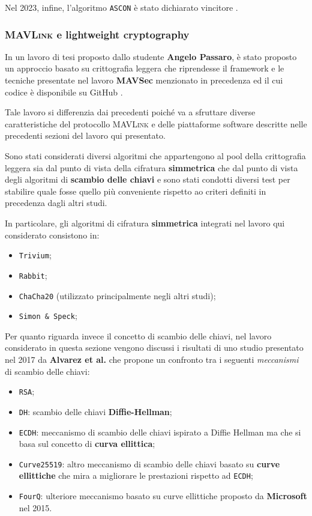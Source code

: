 \documentclass[a4paper, 12pt, oneside]{article}
\theoremstyle{definition}
\begin{document}
Nel 2023, infine, l'algoritmo \texttt{ASCON} è stato dichiarato vincitore \cite{nist-ascon-lwc}.
\newpage
\subsubsection{\textsc{MAVLink} e lightweight cryptography}
In un lavoro di tesi \cite{sec-uav} proposto dallo studente \textbf{Angelo Passaro}, è stato proposto un approccio basato su crittografia leggera che riprendesse il framework e le tecniche presentate nel lavoro \textbf{MAVSec} menzionato in precedenza ed il cui codice è disponibile su GitHub \cite{mavsec-github}.

Tale lavoro si differenzia dai precedenti poiché va a sfruttare diverse caratteristiche del protocollo \textsc{MAVLink} e delle piattaforme software descritte nelle precedenti sezioni del lavoro qui presentato.

Sono stati considerati diversi algoritmi che appartengono al pool della crittografia leggera sia dal punto di vista della cifratura \textbf{simmetrica} che dal punto di vista degli algoritmi di \textbf{scambio delle chiavi} e sono stati condotti diversi test per stabilire quale fosse quello più conveniente rispetto ao criteri definiti in precedenza dagli altri studi.

In particolare, gli algoritmi di cifratura \textbf{simmetrica} integrati nel lavoro qui considerato consistono in:

\begin{itemize}
    \item \texttt{Trivium};
    \item \texttt{Rabbit};
    \item \texttt{ChaCha20} (utilizzato principalmente negli altri studi);
    \item \texttt{Simon \& Speck};
\end{itemize}

Per quanto riguarda invece il concetto di scambio delle chiavi, nel lavoro considerato in questa sezione vengono discussi i risultati di uno studio \cite{10.1007/978-3-319-48799-1_58} presentato nel 2017 da \textbf{Alvarez et al.} che propone un confronto tra i seguenti \textit{meccanismi} di scambio delle chiavi:

\begin{itemize}
    \item \texttt{RSA};
    \item \texttt{DH}: scambio delle chiavi \textbf{Diffie-Hellman};
    \item \texttt{ECDH}: meccanismo di scambio delle chiavi ispirato a Diffie Hellman ma che si basa sul concetto di \textbf{curva ellittica};
    \item \texttt{Curve25519}: altro meccanismo di scambio delle chiavi basato su \textbf{curve ellittiche} che mira a migliorare le prestazioni rispetto ad \texttt{ECDH};
    \item \texttt{FourQ}: ulteriore meccanismo basato su curve ellittiche proposto da \textbf{Microsoft} nel 2015.
\end{itemize}
\end{document}
